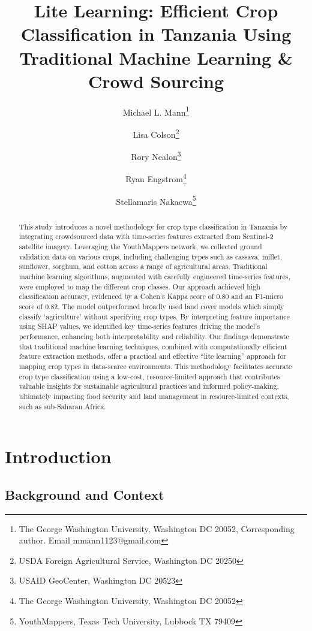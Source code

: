 \documentclass[
]{article}
\title{Lite Learning: Efficient Crop Classification in Tanzania Using
Traditional Machine Learning \& Crowd Sourcing}
\author{
Michael L. Mann\thanks{The George Washington University, Washington DC
20052, Corresponding author. Email mmann1123@gmail.com} \and 
Lisa Colson\thanks{USDA Foreign Agricultural Service, Washington DC
20250} \and 
Rory Nealon\thanks{USAID GeoCenter, Washington DC 20523} \and 
Ryan Engstrom\thanks{The George Washington University, Washington DC
20052} \and 
Stellamaris Nakacwa\thanks{YouthMappers, Texas Tech University, Lubbock
TX 79409}}
\date{}
\begin{document}
\maketitle
\begin{abstract}
This study introduces a novel methodology for crop type classification
in Tanzania by integrating crowdsourced data with time-series features
extracted from Sentinel-2 satellite imagery. Leveraging the YouthMappers
network, we collected ground validation data on various crops, including
challenging types such as cassava, millet, sunflower, sorghum, and
cotton across a range of agricultural areas. Traditional machine
learning algorithms, augmented with carefully engineered time-series
features, were employed to map the different crop classes. Our approach
achieved high classification accuracy, evidenced by a Cohen's Kappa
score of 0.80 and an F1-micro score of 0.82. The model outperformed
broadly used land cover models which simply classify `agriculture'
without specifying crop types. By interpreting feature importance using
SHAP values, we identified key time-series features driving the model's
performance, enhancing both interpretability and reliability. Our
findings demonstrate that traditional machine learning techniques,
combined with computationally efficient feature extraction methods,
offer a practical and effective ``lite learning'' approach for mapping
crop types in data-scarce environments. This methodology facilitates
accurate crop type classification using a low-cost, resource-limited
approach that contributes valuable insights for sustainable agricultural
practices and informed policy-making, ultimately impacting food security
and land management in resource-limited contexts, such as sub-Saharan
Africa.
\end{abstract}

\linenumbers  
\modulolinenumbers[1]  
\pagewiselinenumbers  
{}
\captionsetup{justification=raggedright, singlelinecheck=false}

\hypertarget{introduction}{%
\section{Introduction}\label{introduction}}

\hypertarget{background-and-context}{%
\subsection{Background and Context}\label{background-and-context}}
\end{document}
